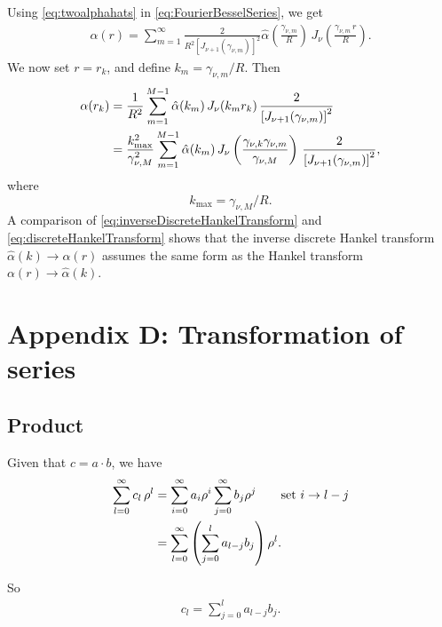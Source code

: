 \documentclass[preprint]{revtex4-1}
\numberwithin{equation}{subsection}
\numberwithin{table}{section}
\begin{document}
Using \eqref{eq:twoalphahats} in \eqref{eq:FourierBesselSeries},
we get
\begin{align*}
  \alpha(r)
=
\sum_{m = 1}^\infty
\frac{ 2 } { R^2 [J_{\nu + 1}(\gamma_{\nu, m})]^2 }
\hat\alpha
  \left(
    \frac{ \gamma_{\nu, m} } { R }
  \right) \,
J_\nu\left(
    \frac{ \gamma_{\nu, m} \, r } { R }
  \right).
\end{align*}
%
We now set $r = r_k$, and define $k_m = \gamma_{\nu, m}/R$.
Then
\begin{align}
  \alpha(r_k)
&=
  \frac{ 1 }{ R^2 }
  \sum_{m = 1}^{M - 1}
    \hat\alpha(k_m) \,
    J_\nu(k_m r_k) \,
    \frac{ 2 }
    { \left[
        J_{\nu+1}(\gamma_{\nu,m})
      \right]^2 }
\notag
\\
&=
  \frac{ k_{\max}^2 }
       { \gamma_{\nu, M}^2 }
  \sum_{m = 1}^{M - 1}
    \hat\alpha(k_m) \,
    J_\nu\left(
      \frac{ \gamma_{\nu, k} \gamma_{\nu, m} }
           { \gamma_{\nu, M} }
    \right) \,
    \frac{ 2 }
    { \left[
        J_{\nu + 1}(\gamma_{\nu, m})
      \right]^2 },
\label{eq:inverseDiscreteHankelTransform}
\end{align}
where
\[
  k_{\max} = \gamma_{\nu, M} / R.
\]
A comparison of \eqref{eq:inverseDiscreteHankelTransform}
and \eqref{eq:discreteHankelTransform}
shows that the inverse discrete Hankel transform
$\hat\alpha(k) \rightarrow \alpha(r)$
assumes the same form as the Hankel transform
$\alpha(r) \rightarrow \hat\alpha(k)$.



\section{Appendix D: Transformation of series}

\subsection{Product}

Given that $c = a \cdot b$, we have
\begin{align*}
  \sum_{l = 0}^{\infty} c_l \, \rho^l
  &=
  \sum_{i = 0}^{\infty} a_i \rho^i
  \sum_{j = 0}^{\infty} b_j \rho^j
  \qquad \mbox{set $i \rightarrow l - j$}
 \notag \\
  &=
  \sum_{l = 0}^{\infty}
  \left(
  \sum_{j = 0}^{l}
    a_{l-j} b_j \right) \rho^l.
\end{align*}

So
\begin{align}
  c_l = \sum_{j = 0}^{l} a_{l-j} b_j.
  \label{eq:product}
\end{align}
\end{document}
